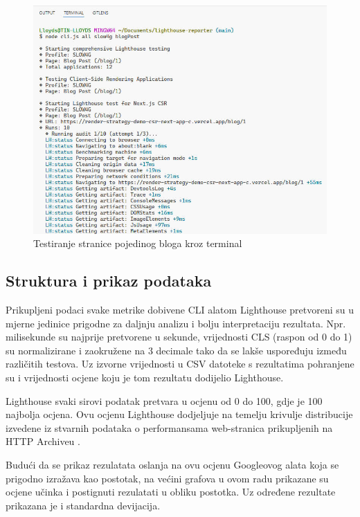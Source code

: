 \begin{figure}[H]
    \centering
    \includegraphics[width=\textwidth]{slike/metodologija/testiranje-aplikacije.jpg}
    \caption{Testiranje stranice pojedinog bloga kroz terminal}
    \label{fig:testiranje-aplikacije}
\end{figure}

\subsection{Struktura i prikaz podataka}

Prikupljeni podaci svake metrike dobivene CLI alatom Lighthouse pretvoreni su u mjerne jedinice prigodne za daljnju analizu i bolju interpretaciju rezultata. Npr. milisekunde su najprije pretvorene u sekunde, vrijednosti CLS (raspon od 0 do 1) su normalizirane i zaokružene na 3 decimale tako da se lakše uspoređuju između različitih testova. Uz izvorne vrijednosti u CSV datoteke s rezultatima pohranjene su i vrijednosti ocjene koju je tom rezultatu dodijelio Lighthouse.

\bigskip

Lighthouse svaki sirovi podatak pretvara u ocjenu od 0 do 100, gdje je 100 najbolja ocjena. Ovu ocjenu Lighthouse dodjeljuje na temelju krivulje distribucije izvedene iz stvarnih podataka o performansama web-stranica prikupljenih na HTTP Archiveu \cite
{chrome2025lighthouse}.

\bigskip

Budući da se prikaz rezulatata oslanja na ovu ocjenu Googleovog alata koja se prigodno izražava kao postotak, na većini grafova u ovom radu prikazane su ocjene učinka i postignuti rezulatati u obliku postotka. Uz određene rezultate prikazana je i standardna devijacija.

